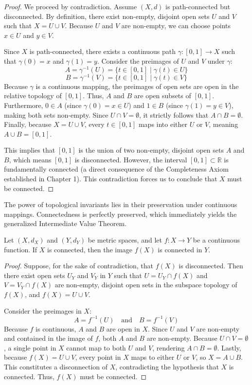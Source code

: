 \begin{proof}
We proceed by contradiction. Assume $(X, d)$ is path-connected but disconnected. By definition, there exist non-empty, disjoint open sets $U$ and $V$ such that $X = U \cup V$. Because $U$ and $V$ are non-empty, we can choose points $x \in U$ and $y \in V$. 

Since $X$ is path-connected, there exists a continuous path $\gamma: [0, 1] \to X$ such that $\gamma(0) = x$ and $\gamma(1) = y$. Consider the preimages of $U$ and $V$ under $\gamma$:
$$ A = \gamma^{-1}(U) = \{ t \in [0, 1] \mid \gamma(t) \in U \} $$
$$ B = \gamma^{-1}(V) = \{ t \in [0, 1] \mid \gamma(t) \in V \} $$
Because $\gamma$ is a continuous mapping, the preimages of open sets are open in the relative topology of $[0, 1]$. Thus, $A$ and $B$ are open subsets of $[0, 1]$. 
Furthermore, $0 \in A$ (since $\gamma(0) = x \in U$) and $1 \in B$ (since $\gamma(1) = y \in V$), making both sets non-empty. Since $U \cap V = \emptyset$, it strictly follows that $A \cap B = \emptyset$. Finally, because $X = U \cup V$, every $t \in [0, 1]$ maps into either $U$ or $V$, meaning $A \cup B = [0, 1]$.

This implies that $[0, 1]$ is the union of two non-empty, disjoint open sets $A$ and $B$, which means $[0, 1]$ is disconnected. However, the interval $[0, 1] \subset \mathbb{R}$ is fundamentally connected (a direct consequence of the Completeness Axiom established in Chapter 1). This contradiction forces us to conclude that $X$ must be connected.
\end{proof}

The power of topological invariants lies in their preservation under continuous mappings. Connectedness is perfectly preserved, which immediately yields the generalized Intermediate Value Theorem.

\begin{theorem}
Let $(X, d_X)$ and $(Y, d_Y)$ be metric spaces, and let $f: X \to Y$ be a continuous function. If $X$ is connected, then the image $f(X)$ is connected in $Y$.
\end{theorem}

\begin{proof}
Suppose, for the sake of contradiction, that $f(X)$ is disconnected. Then there exist open sets $U_Y$ and $V_Y$ in $Y$ such that $U = U_Y \cap f(X)$ and $V = V_Y \cap f(X)$ are non-empty, disjoint open sets in the subspace topology of $f(X)$, and $f(X) = U \cup V$.

Consider the preimages in $X$:
$$ A = f^{-1}(U) \quad \text{and} \quad B = f^{-1}(V) $$
Because $f$ is continuous, $A$ and $B$ are open in $X$. Since $U$ and $V$ are non-empty and contained in the image of $f$, both $A$ and $B$ are non-empty. Because $U \cap V = \emptyset$, a single point in $X$ cannot map to both $U$ and $V$, rendering $A \cap B = \emptyset$. Lastly, because $f(X) = U \cup V$, every point in $X$ maps to either $U$ or $V$, so $X = A \cup B$.
This constitutes a disconnection of $X$, contradicting the hypothesis that $X$ is connected. Thus, $f(X)$ must be connected.
\end{proof}

